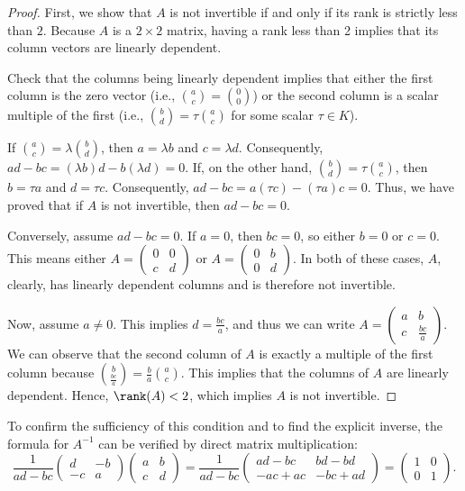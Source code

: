 \begin{proof}
  First, we show that $A$ is not invertible if and only if its rank is strictly less than $2$. Because $A$ is a $2 \times 2$ matrix, having a rank less than 2 implies that its column vectors are linearly dependent.

  \begin{remark}[Exercise]\label{rem:lin_dep_2x2_exercise}
    Check that the columns being linearly dependent implies that either the first column is the zero vector (i.e., $\binom{a}{c} = \binom{0}{0}$) or the second column is a scalar multiple of the first (i.e., $\binom{b}{d} = \tau \binom{a}{c}$ for some scalar $\tau \in K$).
  \end{remark}

  If $\binom{a}{c} = \lambda \binom{b}{d}$, then $a = \lambda b$ and $c = \lambda d$. Consequently, $ad - bc = (\lambda b)d - b(\lambda d) = 0$.
  If, on the other hand, $\binom{b}{d} = \tau \binom{a}{c}$, then $b = \tau a$ and $d = \tau c$. Consequently, $ad - bc = a(\tau c) - (\tau a)c = 0$.
  Thus, we have proved that if $A$ is not invertible, then $ad - bc = 0$.

  Conversely, assume $ad - bc = 0$. If $a = 0$, then $bc = 0$, so either $b = 0$ or $c = 0$. This means either $A = \left(\begin{smallmatrix} 0 & 0 \\ c & d \end{smallmatrix}\right)$ or $A = \left(\begin{smallmatrix} 0 & b \\ 0 & d \end{smallmatrix}\right)$. In both of these cases, $A$, clearly, has linearly dependent columns and is therefore not invertible.

  Now, assume $a \neq 0$. This implies $d = \frac{bc}{a}$, and thus we can write $A = \left(\begin{smallmatrix} a & b \\ c & \frac{bc}{a} \end{smallmatrix}\right)$. We can observe that the second column of $A$ is exactly a multiple of the first column because $\binom{b}{\frac{bc}{a}} = \frac{b}{a} \binom{a}{c}$. This implies that the columns of $A$ are linearly dependent. Hence, $\rank(A) < 2$, which implies $A$ is not invertible.
\end{proof}

To confirm the sufficiency of this condition and to find the explicit inverse, the formula for $A^{-1}$ can be verified by direct matrix multiplication:
\[
\frac{1}{ad-bc} \begin{pmatrix} d & -b \\ -c & a \end{pmatrix} \begin{pmatrix} a & b \\ c & d \end{pmatrix} = \frac{1}{ad-bc} \begin{pmatrix} ad-bc & bd-bd \\ -ac+ac & -bc+ad \end{pmatrix} = \begin{pmatrix} 1 & 0 \\ 0 & 1 \end{pmatrix}.
\]

